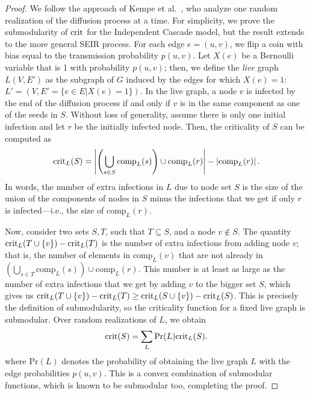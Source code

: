 \begin{proof}
We follow the approach of Kempe et al.\ \cite{kempe:sigkdd03}, who analyze one random realization of the diffusion process at a time. For simplicity, we prove the submodularity of $\text{crit}$ for the Independent Cascade model, but the result extends to the more general SEIR process. For each edge $e=(u,v)$, we flip a coin with bias equal to the transmission probability $p(u,v)$. Let $X(e)$ be a Bernoulli variable that is 1 with probability $p(u,v)$; then, we define the \emph{live} graph $L(V, E')$ as the subgraph of $G$ induced by the edges for which $X(e) = 1$: $L' = (V, E'=\{e \in E | X(e) = 1\})$. In the live graph, a node $v$ is infected by the end of the diffusion process if and only if $v$ is in the same component as one of the seeds in $S$. Without loss of generality, assume there is only one initial infection and let $r$ be the initially infected node. Then, the criticality of $S$ can be computed as
$$
\text{crit}_L(S) = \left|\left(\bigcup_{s \in S} \text{comp}_L(s)\right) \cup \text{comp}_L(r)\right| - \left|\text{comp}_L(r)\right|.
$$
In words, the number of extra infections in $L$ due to node set $S$ is the size of the union of the components of nodes in $S$ minus the infections that we get if only $r$ is infected---i.e., the size of $\text{comp}_L(r)$.

Now, consider two sets $S,T$, such that $T\subseteq S$, and a node $v \not \in S$. The quantity $\text{crit}_L(T \cup \{v\}) - \text{crit}_L(T)$ is the number of extra infections from adding node $v$; that is, the number of elements in $\text{comp}_L(v)$ that are not already in $(\bigcup_{s \in T} \text{comp}_L(s)) \cup \text{comp}_L(r)$. This number is at least as large as the number of extra infections that we get by adding $v$ to the bigger set $S$, which gives us $\text{crit}_L(T \cup \{v\}) - \text{crit}_L(T) \geq \text{crit}_L(S \cup \{v\}) - \text{crit}_L(S)$. This is precisely the definition of submodularity, so the criticality function for a fixed live graph is submodular. Over random realizations of $L$, we obtain
$$
\text{crit}(S) = \sum_{L}\text{Pr}(L) \text{crit}_L(S).
$$
where $\text{Pr}(L)$ denotes the probability of obtaining the live graph $L$ with the edge probabilities $p(u,v)$. This is a convex combination of submodular functions, which is known to be submodular too, completing the proof.
\end{proof}

